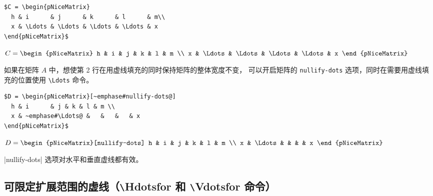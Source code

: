 \documentclass[dvipsnames]{article}%
\begin{document}
\bigskip
\begin{BVerbatim}[baseline=c,boxwidth=9cm]
$C = \begin{pNiceMatrix}
  h & i      & j      & k      & l      & m\\
  x & \Ldots & \Ldots & \Ldots & \Ldots & x 
\end{pNiceMatrix}$
\end{BVerbatim}
$C = \begin{pNiceMatrix}
h & i & j & k & l & m \\
x & \Ldots & \Ldots  & \Ldots & \Ldots & x 
\end{pNiceMatrix}$

\bigskip
如果在矩阵 $A$ 中，想使第 2 行在用虚线填充的同时保持矩阵的整体宽度不变，
可以开启矩阵的 \verb|nullify-dots| 选项，同时在需要用虚线填充的位置使用 \verb|\Ldots| 命令。\par\nobreak

\bigskip
\begin{BVerbatim}[baseline=c,boxwidth=9cm]
$D = \begin{pNiceMatrix}[~emphase#nullify-dots@]
  h & i      & j & k & l & m \\
  x & ~emphase#\Ldots@ &   &   &   & x 
\end{pNiceMatrix}$
\end{BVerbatim}
$D = \begin{pNiceMatrix}[nullify-dots]
h & i      & j & k & l & m \\
x & \Ldots &   &   &   & x 
\end{pNiceMatrix}$

\medskip
 |nullify-dots| 选项对水平和垂直虚线都有效。



\subsection{可限定扩展范围的虚线（\texttt{\textbackslash}Hdotsfor 和 \texttt{\textbackslash}Vdotsfor 命令）}
\end{document}
